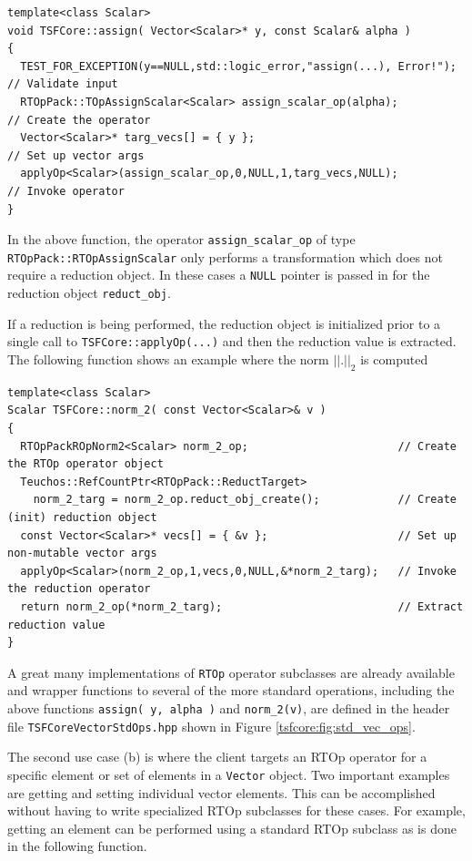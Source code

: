 {\scriptsize\begin{verbatim}
template<class Scalar>
void TSFCore::assign( Vector<Scalar>* y, const Scalar& alpha )
{
  TEST_FOR_EXCEPTION(y==NULL,std::logic_error,"assign(...), Error!");  // Validate input
  RTOpPack::TOpAssignScalar<Scalar> assign_scalar_op(alpha);           // Create the operator
  Vector<Scalar>* targ_vecs[] = { y };                                 // Set up vector args
  applyOp<Scalar>(assign_scalar_op,0,NULL,1,targ_vecs,NULL);           // Invoke operator
}
\end{verbatim}}

{}\noindent{}In the above function, the operator
{}\texttt{assign\_scalar\_op} of type
{}\texttt{RTOpPack::RTOpAssignScalar} only performs a transformation
which does not require a reduction object.  In these cases a
{}\texttt{NULL} pointer is passed in for the reduction object
{}\texttt{reduct\_obj}.

If a reduction is being performed, the reduction object is initialized
prior to a single call to {}\texttt{TSFCore::applyOp(\-...)} and then
the reduction value is extracted.  The following function shows an
example where the norm $||.||_2$ is computed

{\scriptsize\begin{verbatim}
template<class Scalar>
Scalar TSFCore::norm_2( const Vector<Scalar>& v )
{
  RTOpPackROpNorm2<Scalar> norm_2_op;                       // Create the RTOp operator object
  Teuchos::RefCountPtr<RTOpPack::ReductTarget>
    norm_2_targ = norm_2_op.reduct_obj_create();            // Create (init) reduction object
  const Vector<Scalar>* vecs[] = { &v };                    // Set up non-mutable vector args
  applyOp<Scalar>(norm_2_op,1,vecs,0,NULL,&*norm_2_targ);   // Invoke the reduction operator
  return norm_2_op(*norm_2_targ);                           // Extract reduction value
}
\end{verbatim}}

{}\noindent{}A great many implementations of {}\texttt{RTOp} operator
subclasses are already available and wrapper functions to several of
the more standard operations, including the above functions
{}\texttt{assign( y, alpha )} and {}\texttt{norm\_2(v)}, are defined
in the header file {}\texttt{TSFCore\-Vector\-Std\-Ops.hpp} shown in
Figure {}\ref{tsfcore:fig:std_vec_ops}.

The second use case (b) is where the client targets an RTOp operator
for a specific element or set of elements in a {}\texttt{Vector}
object.  Two important examples are getting and setting individual
vector elements.  This can be accomplished without having to write
specialized RTOp subclasses for these cases.  For example, getting an
element can be performed using a standard RTOp subclass as is done in
the following function.

